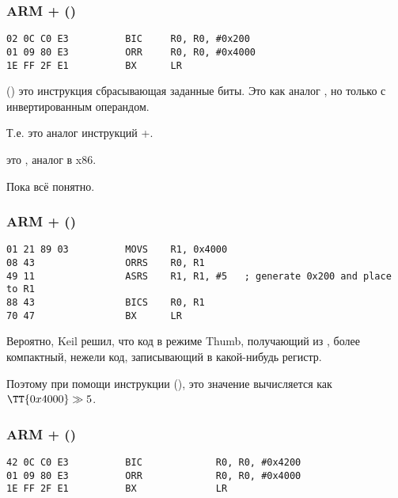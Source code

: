 \subsubsection{ARM + \OptimizingKeilVI (\ARMMode)}

\begin{lstlisting}[caption=\OptimizingKeilVI (\ARMMode)]
02 0C C0 E3          BIC     R0, R0, #0x200
01 09 80 E3          ORR     R0, R0, #0x4000
1E FF 2F E1          BX      LR
\end{lstlisting}

 () это инструкция сбрасывающая заданные биты. 
Это как аналог \AND, но только с инвертированным операндом.

Т.е. это аналог инструкций \NOT+\AND.

 это , аналог \OR в x86.

Пока всё понятно.

\subsubsection{ARM + \OptimizingKeilVI (\ThumbMode)}

\begin{lstlisting}[caption=\OptimizingKeilVI (\ThumbMode)]
01 21 89 03          MOVS    R1, 0x4000
08 43                ORRS    R0, R1
49 11                ASRS    R1, R1, #5   ; generate 0x200 and place to R1
88 43                BICS    R0, R1
70 47                BX      LR
\end{lstlisting}

Вероятно, Keil решил, что код в режиме Thumb,
получающий  из , 
более компактный, нежели код, 
записывающий  в какой-нибудь регистр.

Поэтому при помощи инструкции  (\ASRdesc), это значение вычисляется как $\TT{0x4000} \gg 5$.

\subsubsection{ARM + \OptimizingXcodeIV (\ARMMode)}
\label{anomaly:LLVM}
\myindex{\CompilerAnomaly}

\begin{lstlisting}[caption=\OptimizingXcodeIV (\ARMMode),label=ARM_leaf_example3]
42 0C C0 E3          BIC             R0, R0, #0x4200
01 09 80 E3          ORR             R0, R0, #0x4000
1E FF 2F E1          BX              LR
\end{lstlisting}

